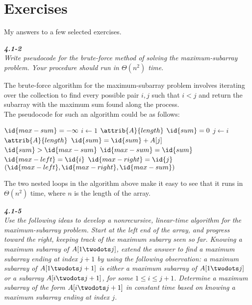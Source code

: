 \documentclass[8pt,a4paper]{article}
\begin{document}
\section*{Exercises}
My answers to a few selected exercises.

\begin{framed}
\textbf{\textit{4.1-2}} \\
\textit{Write pseudocode for the brute-force method of solving the maximum-subarray problem.
Your procedure should run in $\Theta(n^{2})$ time.}
\end{framed}

	The brute-force algorithm for the maximum-subarray problem involves iterating
over the collection to find every possible pair $i, j$ such that $i < j$ and return
the subarray with the maximum sum found along the process. \\

	The pseudocode for such an algorithm could be as follows:

\begin{codebox}
  \li $\id{max-sum} = - \infty$
  \li \For $i \gets 1$ \To $\attrib{A}{length}$
        \Do
  \li     $\id{sum} = 0$
  \li     \For $j \gets i$ \To $\attrib{A}{length}$
            \Do
  \li         $\id{sum} = \id{sum} + A[j]$
  \li         \If $\id{sum} > \id{max-sum}$
                \Then
  \li             $\id{max-sum} = \id{sum}$
  \li             $\id{max-left} = \id{i}$
  \li             $\id{max-right} = \id{j}$
                \End
            \End
      \End
  \li \Return $(\id{max-left}, \id{max-right}, \id{max-sum})$
\end{codebox}

	The two nested loops in the algorithm above make it easy to see that it
runs in $\Theta(n^{2})$ time, where $n$ is the length of the array.

\begin{framed}
\textbf{\textit{4.1-5}} \\
\textit{Use the following ideas to develop a nonrecursive, linear-time algorithm for the
maximum-subarray problem. Start at the left end of the array, and progress toward
the right, keeping track of the maximum subarry seen so far. Knowing a maximum
subarray of $A[1 \twodots j]$, extend the answer to find a maximum subarray ending
at index $j + 1$ by using the following observation: a maximum subarray of
$A[1 \twodots j + 1]$ is either a maximum subarray of $A[1 \twodots j]$ or a subarray
$A[i \twodots j + 1]$, for some $1 \leq i \leq j + 1$. Determine a maximum subarray
of the form $A[i \twodots j + 1]$ in constant time based on knowing a maximum
subarray ending at index $j$.}
\end{framed}
\end{document}
